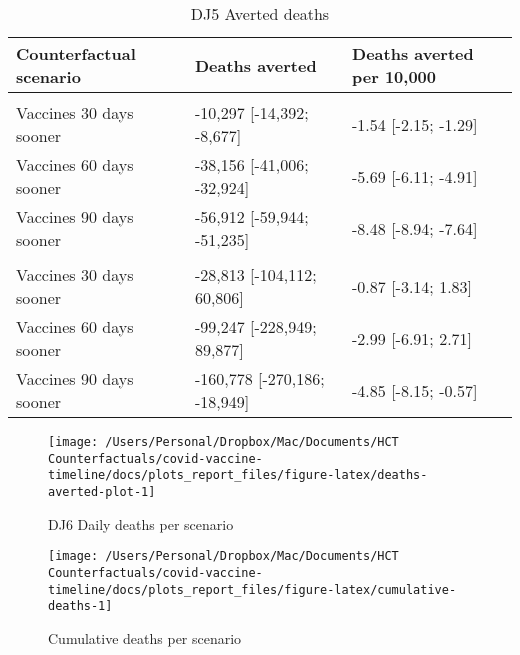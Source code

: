 \documentclass[
  12pt,
]{article}
\begin{document}
\begin{table}

\caption{\label{tab:deaths-averted-table}DJ5 Averted deaths}
\centering
\begin{tabular}[t]{lll}
\toprule
Counterfactual scenario & Deaths averted & Deaths averted per 10,000\\
\midrule
\addlinespace[0.3em]
\multicolumn{3}{l}{\textbf{United Kingdom}}\\
\hspace{1em}Vaccines 30 days sooner & -10,297 [-14,392; -8,677] & -1.54 [-2.15; -1.29]\\
\hspace{1em}Vaccines 60 days sooner & -38,156 [-41,006; -32,924] & -5.69 [-6.11; -4.91]\\
\hspace{1em}Vaccines 90 days sooner & -56,912 [-59,944; -51,235] & -8.48 [-8.94; -7.64]\\
\addlinespace[0.3em]
\multicolumn{3}{l}{\textbf{United States}}\\
\hspace{1em}Vaccines 30 days sooner & -28,813 [-104,112; 60,806] & -0.87 [-3.14; 1.83]\\
\hspace{1em}Vaccines 60 days sooner & -99,247 [-228,949; 89,877] & -2.99 [-6.91; 2.71]\\
\hspace{1em}Vaccines 90 days sooner & -160,778 [-270,186; -18,949] & -4.85 [-8.15; -0.57]\\
\bottomrule
\end{tabular}
\end{table}

\begin{figure}

{\centering \texttt{[image: /Users/Personal/Dropbox/Mac/Documents/HCT Counterfactuals/covid-vaccine-timeline/docs/plots\_report\_files/figure-latex/deaths-averted-plot-1]} 

}

\caption{DJ6 Daily deaths per scenario}\label{fig:deaths-averted-plot}
\end{figure}
\begin{figure}

{\centering \texttt{[image: /Users/Personal/Dropbox/Mac/Documents/HCT Counterfactuals/covid-vaccine-timeline/docs/plots\_report\_files/figure-latex/cumulative-deaths-1]} 

}

\caption{Cumulative deaths per scenario}\label{fig:cumulative-deaths}
\end{figure}
\end{document}
